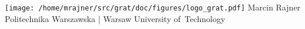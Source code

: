 \documentclass{book}
\begin{document}
\hypersetup{pageanchor=false,citecolor=violet}
\begin{titlepage}
\phantom{D}
\vfill
{
  \texttt{[image: /home/mrajner/src/grat/doc/figures/logo\_grat.pdf]}
}
\newpage
\phantom{D}
\vfill
Marcin Rajner\\
{\small Politechnika Warszawska | Warsaw University of~Technology}\\
\end{titlepage}
\clearemptydoublepage
{}
\tableofcontents
\clearemptydoublepage
{}
\hypersetup{pageanchor=true,citecolor=violet}
\end{document}
